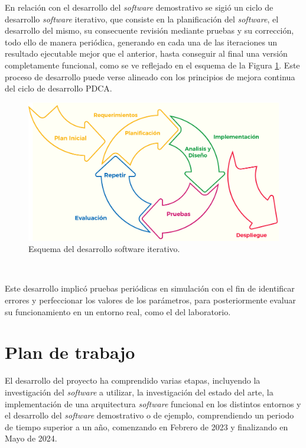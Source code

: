 En relación con el desarrollo del \textit{software} demostrativo se sigió un
ciclo de desarrollo \textit{software} iterativo, que consiste en la
planificación del \textit{software}, el desarrollo del mismo, su consecuente
revisión mediante pruebas y su corrección, todo ello de manera periódica,
generando en cada una de las iteraciones un resultado ejecutable mejor que el
anterior, hasta conseguir al final una versión completamente funcional, como se
ve reflejado en el esquema de la Figura \ref{fig:desarrollo_iterativo}.
Este proceso de desarrollo puede verse alineado con los principios de mejora
continua del ciclo de desarrollo PDCA.

\begin{figure} [h!]
    \begin{center}
      \includegraphics[width=12cm]{figs/desarrollo_iterativo}
    \end{center}
    \caption{Esquema del desarrollo software iterativo.}
    \label{fig:desarrollo_iterativo}
  \end{figure}\

Este desarrollo implicó pruebas periódicas en simulación con el fin de
identificar errores y perfeccionar los valores de los parámetros, para
posteriormente evaluar su funcionamiento en un entorno real, como el del
laboratorio.


\section{Plan de trabajo}
\label{sec:plantrabajo}

El desarrollo del proyecto ha comprendido varias etapas, incluyendo la
investigación del \textit{software} a utilizar, la investigación del estado del
arte, la implementación de una arquitectura \textit{software} funcional en los
distintos entornos y el desarrollo del \textit{software} demostrativo o de
ejemplo, comprendiendo un periodo de tiempo superior a un año, comenzando en
Febrero de 2023 y finalizando en Mayo de 2024.

